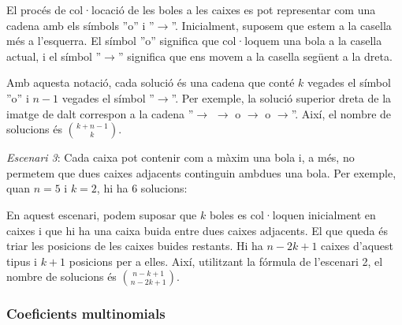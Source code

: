 El procés de col·locació de les boles a les caixes es pot representar
com una cadena amb els símbols ''o'' i ''$\rightarrow$''. Inicialment,
suposem que estem a la casella més a l'esquerra. El símbol ''o''
significa que col·loquem una bola a la casella actual, i el símbol
''$\rightarrow$'' significa que ens movem a la casella següent a la
dreta.

Amb aquesta notació, cada solució és una cadena que conté $k$ vegades
el símbol ''o'' i $n-1$ vegades el símbol ''$\rightarrow$''. Per
exemple, la solució superior dreta de la imatge de dalt correspon a la
cadena ''$\rightarrow$ $\rightarrow$ o $\rightarrow$ o
$\rightarrow$''. Així, el nombre de solucions és ${k+n-1 \choose k}$.

\textit{Escenari 3}: Cada caixa pot contenir com a màxim una bola i, a
més, no permetem que dues caixes adjacents continguin ambdues una bola. Per
exemple, quan $n=5$ i $k=2$, hi ha 6 solucions:




\begin{center}
\end{center}


En aquest escenari, podem suposar que $k$ boles es col·loquen
inicialment en caixes i que hi ha una caixa buida entre dues caixes
adjacents. El que queda és triar les posicions de les caixes buides
restants. Hi ha $n-2k+1$ caixes d'aquest tipus i $k+1$ posicions per a
elles. Així, utilitzant la fórmula de l'escenari 2, el nombre de solucions
és ${n-k+1 \choose n-2k+1}$.

\subsubsection{Coeficients multinomials}

